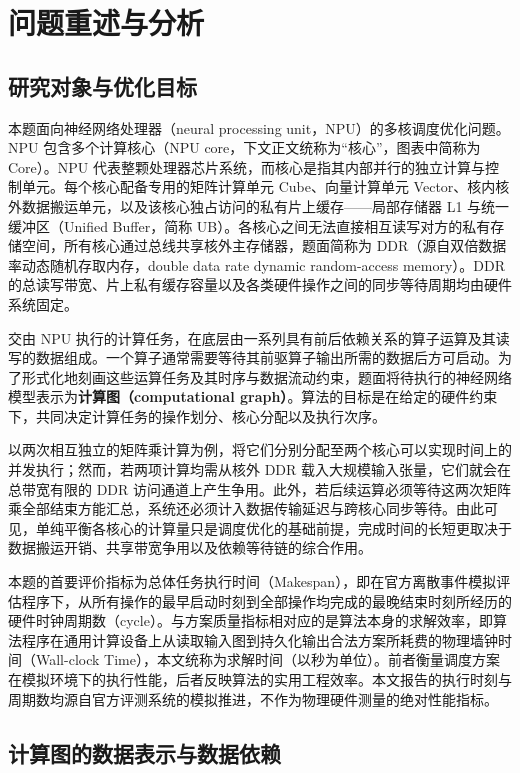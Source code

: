 \documentclass[anonymous,notoc]{gmcm2026}
\begin{document}
\section{问题重述与分析}

\subsection{研究对象与优化目标}

本题面向神经网络处理器（neural processing unit，NPU）的多核调度优化问题。NPU 包含多个计算核心（NPU core，下文正文统称为``核心''，图表中简称为 Core）。NPU 代表整颗处理器芯片系统，而核心是指其内部并行的独立计算与控制单元。每个核心配备专用的矩阵计算单元 Cube、向量计算单元 Vector、核内核外数据搬运单元，以及该核心独占访问的私有片上缓存------局部存储器 L1 与统一缓冲区（Unified Buffer，简称 UB）。各核心之间无法直接相互读写对方的私有存储空间，所有核心通过总线共享核外主存储器，题面简称为 DDR（源自双倍数据率动态随机存取内存，double data rate dynamic random-access memory）。DDR 的总读写带宽、片上私有缓存容量以及各类硬件操作之间的同步等待周期均由硬件系统固定。

交由 NPU 执行的计算任务，在底层由一系列具有前后依赖关系的算子运算及其读写的数据组成。一个算子通常需要等待其前驱算子输出所需的数据后方可启动。为了形式化地刻画这些运算任务及其时序与数据流动约束，题面将待执行的神经网络模型表示为\textbf{计算图（computational graph）}。算法的目标是在给定的硬件约束下，共同决定计算任务的操作划分、核心分配以及执行次序\cite{ref1}。

以两次相互独立的矩阵乘计算为例，将它们分别分配至两个核心可以实现时间上的并发执行；然而，若两项计算均需从核外 DDR 载入大规模输入张量，它们就会在总带宽有限的 DDR 访问通道上产生争用。此外，若后续运算必须等待这两次矩阵乘全部结束方能汇总，系统还必须计入数据传输延迟与跨核心同步等待。由此可见，单纯平衡各核心的计算量只是调度优化的基础前提，完成时间的长短更取决于数据搬运开销、共享带宽争用以及依赖等待链的综合作用。

本题的首要评价指标为总体任务执行时间（Makespan），即在官方离散事件模拟评估程序下，从所有操作的最早启动时刻到全部操作均完成的最晚结束时刻所经历的硬件时钟周期数（cycle）。与方案质量指标相对应的是算法本身的求解效率，即算法程序在通用计算设备上从读取输入图到持久化输出合法方案所耗费的物理墙钟时间（Wall-clock Time），本文统称为求解时间（以秒为单位）。前者衡量调度方案在模拟环境下的执行性能，后者反映算法的实用工程效率。本文报告的执行时刻与周期数均源自官方评测系统的模拟推进，不作为物理硬件测量的绝对性能指标。

\subsection{计算图的数据表示与数据依赖}
\end{document}
